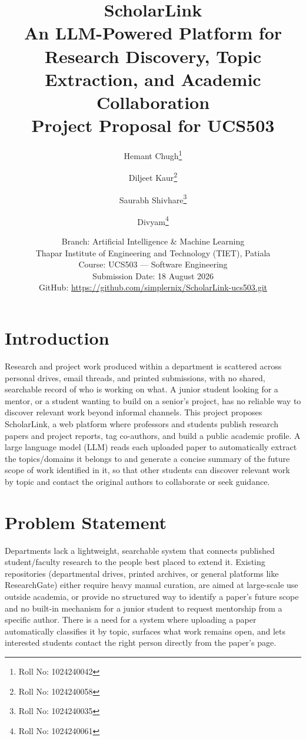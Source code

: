 \documentclass[11pt]{article}
\title{\textbf{ScholarLink}\\[4pt]
\large An LLM-Powered Platform for Research Discovery, Topic Extraction, and Academic Collaboration\\[8pt]
Project Proposal for UCS503}
\author{
Hemant Chugh\thanks{Roll No: 1024240042} \and
Diljeet Kaur\thanks{Roll No: 1024240058} \and
Saurabh Shivhare\thanks{Roll No: 1024240035} \and
Divyam\thanks{Roll No: 1024240061}
}
\date{
Branch: Artificial Intelligence \& Machine Learning\\
Thapar Institute of Engineering and Technology (TIET), Patiala\\
Course: UCS503 --- Software Engineering\\
Submission Date: 18 August 2026\\
GitHub: \url{https://github.com/simplernix/ScholarLink-ucs503.git}
}
\begin{document}
\maketitle

\section{Introduction}
Research and project work produced within a department is scattered across personal drives, email threads, and printed submissions, with no shared, searchable record of who is working on what. A junior student looking for a mentor, or a student wanting to build on a senior's project, has no reliable way to discover relevant work beyond informal channels. This project proposes ScholarLink, a web platform where professors and students publish research papers and project reports, tag co-authors, and build a public academic profile. A large language model (LLM) reads each uploaded paper to automatically extract the topics/domains it belongs to and generate a concise summary of the future scope of work identified in it, so that other students can discover relevant work by topic and contact the original authors to collaborate or seek guidance.

\section{Problem Statement}
Departments lack a lightweight, searchable system that connects published student/faculty research to the people best placed to extend it. Existing repositories (departmental drives, printed archives, or general platforms like ResearchGate) either require heavy manual curation, are aimed at large-scale use outside academia, or provide no structured way to identify a paper's future scope and no built-in mechanism for a junior student to request mentorship from a specific author. There is a need for a system where uploading a paper automatically classifies it by topic, surfaces what work remains open, and lets interested students contact the right person directly from the paper's page.
\end{document}
